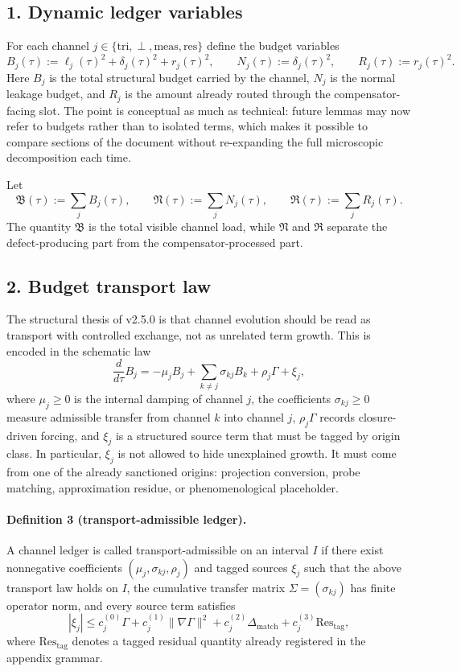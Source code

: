 \subsection*{1. Dynamic ledger variables}
For each channel $j\in\{\mathrm{tri},\perp,\mathrm{meas},\mathrm{res}\}$ define the
budget variables
\[
B_j(\tau):=\ell_j(\tau)^2+\delta_j(\tau)^2+r_j(\tau)^2,
\qquad
N_j(\tau):=\delta_j(\tau)^2,
\qquad
R_j(\tau):=r_j(\tau)^2.
\]
Here $B_j$ is the total structural budget carried by the channel, $N_j$ is the
normal leakage budget, and $R_j$ is the amount already routed through the
compensator-facing slot. The point is conceptual as much as technical: future
lemmas may now refer to budgets rather than to isolated terms, which makes it
possible to compare sections of the document without re-expanding the full
microscopic decomposition each time.

Let
\[
\mathfrak B(\tau):=\sum_j B_j(\tau),
\qquad
\mathfrak N(\tau):=\sum_j N_j(\tau),
\qquad
\mathfrak R(\tau):=\sum_j R_j(\tau).
\]
The quantity $\mathfrak B$ is the total visible channel load, while
$\mathfrak N$ and $\mathfrak R$ separate the defect-producing part from the
compensator-processed part.

\subsection*{2. Budget transport law}
The structural thesis of v2.5.0 is that channel evolution should be read as
transport with controlled exchange, not as unrelated term growth. This is encoded
in the schematic law
\[
\frac{d}{d\tau}B_j
= -\mu_j B_j + \sum_{k\neq j}\sigma_{kj}B_k + \rho_j\Gamma + \xi_j,
\]
where $\mu_j\ge0$ is the internal damping of channel $j$, the coefficients
$\sigma_{kj}\ge0$ measure admissible transfer from channel $k$ into channel $j$,
$\rho_j\Gamma$ records closure-driven forcing, and $\xi_j$ is a structured source
term that must be tagged by origin class. In particular, $\xi_j$ is not allowed to
hide unexplained growth. It must come from one of the already sanctioned origins:
projection conversion, probe matching, approximation residue, or phenomenological
placeholder.

\paragraph{Definition 3 (transport-admissible ledger).}
A channel ledger is called transport-admissible on an interval $I$ if there exist
nonnegative coefficients $(\mu_j,\sigma_{kj},\rho_j)$ and tagged sources $\xi_j$
such that the above transport law holds on $I$, the cumulative transfer matrix
$\Sigma=(\sigma_{kj})$ has finite operator norm, and every source term satisfies
\[
|\xi_j| \le c_j^{(0)}\Gamma + c_j^{(1)}\|\nabla\Gamma\|^2 + c_j^{(2)}\Delta_{\mathrm{match}}
+ c_j^{(3)}\mathrm{Res}_{\mathrm{tag}},
\]
where $\mathrm{Res}_{\mathrm{tag}}$ denotes a tagged residual quantity already
registered in the appendix grammar.

